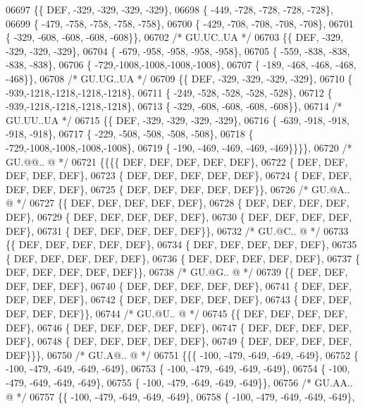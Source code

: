 \begin{DoxyCode}
06697 \{\{  DEF, -329, -329, -329, -329\},
06698 \{ -449, -728, -728, -728, -728\},
06699 \{ -479, -758, -758, -758, -758\},
06700 \{ -429, -708, -708, -708, -708\},
06701 \{ -329, -608, -608, -608, -608\}\},
06702 \textcolor{comment}{/* GU.UC..UA */}
06703 \{\{  DEF, -329, -329, -329, -329\},
06704 \{ -679, -958, -958, -958, -958\},
06705 \{ -559, -838, -838, -838, -838\},
06706 \{ -729,-1008,-1008,-1008,-1008\},
06707 \{ -189, -468, -468, -468, -468\}\},
06708 \textcolor{comment}{/* GU.UG..UA */}
06709 \{\{  DEF, -329, -329, -329, -329\},
06710 \{ -939,-1218,-1218,-1218,-1218\},
06711 \{ -249, -528, -528, -528, -528\},
06712 \{ -939,-1218,-1218,-1218,-1218\},
06713 \{ -329, -608, -608, -608, -608\}\},
06714 \textcolor{comment}{/* GU.UU..UA */}
06715 \{\{  DEF, -329, -329, -329, -329\},
06716 \{ -639, -918, -918, -918, -918\},
06717 \{ -229, -508, -508, -508, -508\},
06718 \{ -729,-1008,-1008,-1008,-1008\},
06719 \{ -190, -469, -469, -469, -469\}\}\}\},
06720 \textcolor{comment}{/* GU.@@.. @ */}
06721 \{\{\{\{  DEF,  DEF,  DEF,  DEF,  DEF\},
06722 \{  DEF,  DEF,  DEF,  DEF,  DEF\},
06723 \{  DEF,  DEF,  DEF,  DEF,  DEF\},
06724 \{  DEF,  DEF,  DEF,  DEF,  DEF\},
06725 \{  DEF,  DEF,  DEF,  DEF,  DEF\}\},
06726 \textcolor{comment}{/* GU.@A.. @ */}
06727 \{\{  DEF,  DEF,  DEF,  DEF,  DEF\},
06728 \{  DEF,  DEF,  DEF,  DEF,  DEF\},
06729 \{  DEF,  DEF,  DEF,  DEF,  DEF\},
06730 \{  DEF,  DEF,  DEF,  DEF,  DEF\},
06731 \{  DEF,  DEF,  DEF,  DEF,  DEF\}\},
06732 \textcolor{comment}{/* GU.@C.. @ */}
06733 \{\{  DEF,  DEF,  DEF,  DEF,  DEF\},
06734 \{  DEF,  DEF,  DEF,  DEF,  DEF\},
06735 \{  DEF,  DEF,  DEF,  DEF,  DEF\},
06736 \{  DEF,  DEF,  DEF,  DEF,  DEF\},
06737 \{  DEF,  DEF,  DEF,  DEF,  DEF\}\},
06738 \textcolor{comment}{/* GU.@G.. @ */}
06739 \{\{  DEF,  DEF,  DEF,  DEF,  DEF\},
06740 \{  DEF,  DEF,  DEF,  DEF,  DEF\},
06741 \{  DEF,  DEF,  DEF,  DEF,  DEF\},
06742 \{  DEF,  DEF,  DEF,  DEF,  DEF\},
06743 \{  DEF,  DEF,  DEF,  DEF,  DEF\}\},
06744 \textcolor{comment}{/* GU.@U.. @ */}
06745 \{\{  DEF,  DEF,  DEF,  DEF,  DEF\},
06746 \{  DEF,  DEF,  DEF,  DEF,  DEF\},
06747 \{  DEF,  DEF,  DEF,  DEF,  DEF\},
06748 \{  DEF,  DEF,  DEF,  DEF,  DEF\},
06749 \{  DEF,  DEF,  DEF,  DEF,  DEF\}\}\},
06750 \textcolor{comment}{/* GU.A@.. @ */}
06751 \{\{\{ -100, -479, -649, -649, -649\},
06752 \{ -100, -479, -649, -649, -649\},
06753 \{ -100, -479, -649, -649, -649\},
06754 \{ -100, -479, -649, -649, -649\},
06755 \{ -100, -479, -649, -649, -649\}\},
06756 \textcolor{comment}{/* GU.AA.. @ */}
06757 \{\{ -100, -479, -649, -649, -649\},
06758 \{ -100, -479, -649, -649, -649\},

\end{DoxyCode}
